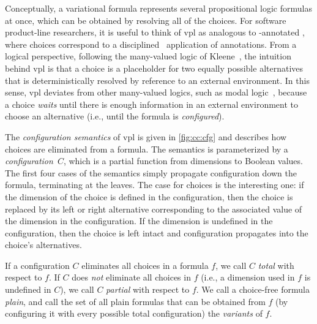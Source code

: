 \label{section:vpl:semantics}
%
Conceptually, a variational formula represents several propositional logic
formulas at once, which can be obtained by resolving all of the choices. For
software product-line researchers, it is useful to think of \ac{vpl} as analogous
to -annotated \pl{}, where choices correspond to a
disciplined~\cite{LKA:AOSD11} application of  annotations.
%
From a logical perspective, following the many-valued logic of
Kleene~\cite{kleene1968introduction,Rescher1969-RESML}, the intuition behind
\ac{vpl} is that a choice is a placeholder for two equally possible alternatives
that is deterministically resolved by reference to an external environment.
%
In this sense, \ac{vpl} deviates from other many-valued logics, such as modal
logic~\cite{sep-logic-modal}, because a choice \emph{waits} until there is
enough information in an external environment to choose an alternative (i.e.,
until the formula is \emph{configured}).

The \emph{configuration semantics} of \ac{vpl} is given in
\autoref{fig:cc:cfg} and describes how choices are eliminated from a
formula. The semantics is parameterized by a \emph{configuration}\ $C$, which is
a partial function from dimensions to Boolean values.
%
The first four cases of the semantics simply propagate configuration down the
formula, terminating at the leaves. The case for choices is the interesting one:
if the dimension of the choice is defined in the configuration, then the choice
is replaced by its left or right alternative corresponding to the associated
value of the dimension in the configuration. If the dimension is undefined in
the configuration, then the choice is left intact and configuration propagates
into the choice's alternatives.

If a configuration $C$ eliminates all choices in a formula $f$, we call $C$
\emph{total} with respect to $f$. If $C$ does \emph{not} eliminate all choices
in $f$ (i.e., a dimension used in $f$ is undefined in $C$), we call $C$
\emph{partial} with respect to $f$.
%
We call a choice-free formula \emph{plain}, and call the set of all plain
formulas that can be obtained from $f$ (by configuring it with every possible
total configuration) the \emph{variants} of $f$.

